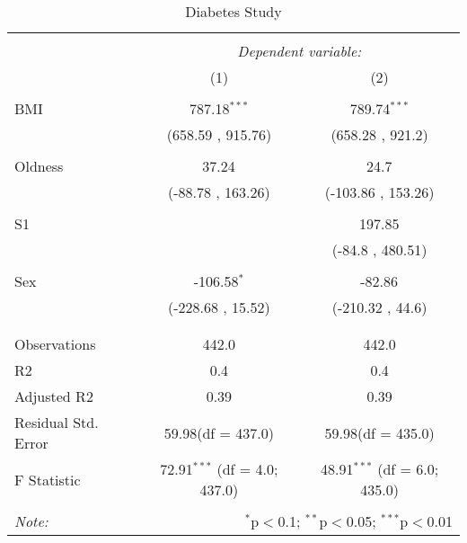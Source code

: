 \documentclass[12pt]{article}
\numberwithin{equation}{subsection}
\begin{document}
\begin{table}[!htbp] \centering
  \caption{Diabetes Study}
  \label{}
\begin{tabular}{@{\extracolsep{5pt}}lcc}
\\[-1.8ex]\hline
\hline \\[-1.8ex]
& \multicolumn{2}{c}{\textit{Dependent variable:}} \
\cr \cline{2-3}
\\[-1.8ex] & (1) & (2) \\
\hline \\[-1.8ex]
 BMI & 787.18$^{***}$ & 789.74$^{***}$ \\
  & (658.59 , 915.76) & (658.28 , 921.2) \\
  & & \\
 Oldness & 37.24$^{}$ & 24.7$^{}$ \\
  & (-88.78 , 163.26) & (-103.86 , 153.26) \\
  & & \\
 S1 & & 197.85$^{}$ \\
  & & (-84.8 , 480.51) \\
  & & \\
 Sex & -106.58$^{*}$ & -82.86$^{}$ \\
  & (-228.68 , 15.52) & (-210.32 , 44.6) \\
  & & \\
\hline \\[-1.8ex]
 Observations & 442.0 & 442.0 \\
 R${2}$ & 0.4 & 0.4 \\
 Adjusted R${2}$ & 0.39 & 0.39 \\
 Residual Std. Error & 59.98(df = 437.0) & 59.98(df = 435.0)  \\
 F Statistic & 72.91$^{***}$ (df = 4.0; 437.0) & 48.91$^{***}$ (df = 6.0; 435.0) \\
\hline
\hline \\[-1.8ex]
\textit{Note:} & \multicolumn{2}{r}{$^{*}$p$<$0.1; $^{**}$p$<$0.05; $^{***}$p$<$0.01} \\
\end{tabular}
\end{table}
\end{document}
